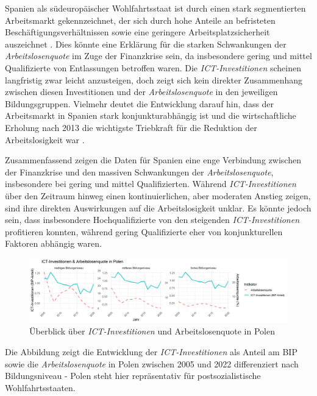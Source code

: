 Spanien als südeuropäischer Wohlfahrtsstaat ist durch einen stark segmentierten 
Arbeitsmarkt gekennzeichnet, der sich durch hohe Anteile an befristeten 
Beschäftigungsverhältnissen sowie eine geringere Arbeitsplatzsicherheit auszeichnet 
\parencite[vgl.][159–160]{bentolila2012two}. Dies könnte eine Erklärung für die starken 
Schwankungen der \textit{Arbeitslosenquote} im Zuge der Finanzkrise sein, da insbesondere 
gering und mittel Qualifizierte von Entlassungen betroffen waren. Die 
\textit{\ac{ICT}-Investitionen} scheinen langfristig zwar leicht anzusteigen, doch zeigt 
sich kein direkter Zusammenhang zwischen diesen Investitionen und der 
\textit{Arbeitslosenquote} in den jeweiligen Bildungsgruppen. Vielmehr deutet die 
Entwicklung darauf hin, dass der Arbeitsmarkt in Spanien stark konjunkturabhängig ist und 
die wirtschaftliche Erholung nach 2013 die wichtigste Triebkraft für die Reduktion der 
Arbeitslosigkeit war \parencite[vgl.][157–159]{bentolila2012two}.

Zusammenfassend zeigen die Daten für Spanien eine enge Verbindung zwischen der 
Finanzkrise und den massiven Schwankungen der \textit{Arbeitslosenquote}, insbesondere 
bei gering und mittel Qualifizierten. Während \textit{\ac{ICT}-Investitionen} über den 
Zeitraum hinweg einen kontinuierlichen, aber moderaten Anstieg zeigen, sind ihre 
direkten Auswirkungen auf die Arbeitslosigkeit unklar. Es könnte jedoch sein, dass 
insbesondere Hochqualifizierte von den steigenden \textit{\ac{ICT}-Investitionen} 
profitieren konnten, während gering Qualifizierte eher von konjunkturellen 
Faktoren abhängig waren.

\begin{figure}[htbp]
    \centering
    \includegraphics[width=\textwidth]{assets/plot_poland_final.png}
    \caption{Überblick über \textit{\ac{ICT}-Investitionen} und Arbeitslosenquote 
    in Polen}
    \label{fig:poland}
\end{figure}

Die Abbildung zeigt die Entwicklung der \textit{\ac{ICT}-Investitionen} als Anteil 
am BIP sowie die \textit{Arbeitslosenquote} in Polen zwischen 2005 und 2022 
differenziert nach Bildungsniveau - Polen steht hier repräsentativ für 
postsozialistische Wohlfahrtsstaaten.

